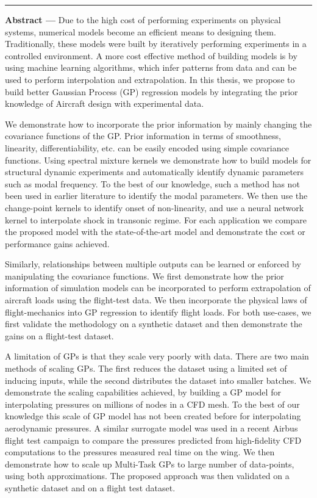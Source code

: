 \noindent\rule[2pt]{\textwidth}{0.5pt}
{\large\textbf{Abstract ---}}
Due to the high cost of performing experiments on physical systems, numerical models become an efficient means to designing them. Traditionally, these models were built by iteratively performing experiments in a controlled environment. A more cost effective method of building models is by using machine learning algorithms, which infer patterns from data and can be used to perform interpolation and extrapolation. In this thesis, we propose to build better Gaussian Process (GP) regression models by integrating the prior knowledge of Aircraft design with experimental data. 

We demonstrate how to incorporate the prior information by mainly changing the covariance functions of the GP. Prior information in terms of smoothness, linearity, differentiability, etc. can be easily encoded using simple covariance functions. Using spectral mixture kernels we demonstrate how to build models for structural dynamic experiments and automatically identify dynamic parameters such as modal frequency. To the best of our knowledge, such a method has not been used in earlier literature to identify the modal parameters. We then use the change-point kernels to identify onset of non-linearity, and use a neural network kernel to interpolate shock in transonic regime. For each application we compare the proposed model with the state-of-the-art model and demonstrate the cost or performance gains achieved. 

Similarly, relationships between multiple outputs can be learned or enforced by manipulating the covariance functions. We first demonstrate how the prior information of simulation models can be incorporated to perform extrapolation of aircraft loads using the flight-test data. We then incorporate the physical laws of flight-mechanics into GP regression to identify flight loads. For both use-cases, we first validate the methodology on a synthetic dataset and then demonstrate the gains on a flight-test dataset.

A limitation of GPs is that they scale very poorly with data. There are two main methods of scaling GPs. The first reduces the dataset using a limited set of inducing inputs, while the second distributes the dataset into smaller batches. We demonstrate the scaling capabilities achieved, by building a GP model for interpolating pressures on millions of nodes in a CFD mesh. To the best of our knowledge this scale of GP model has not been created before for interpolating aerodynamic pressures. A similar surrogate model was used in a recent Airbus flight test campaign to compare the pressures predicted from high-fidelity CFD computations to the pressures measured real time on the wing. We then demonstrate how to scale up Multi-Task GPs to large number of data-points, using both approximations. The proposed approach was then validated on a synthetic dataset and on a flight test dataset.

